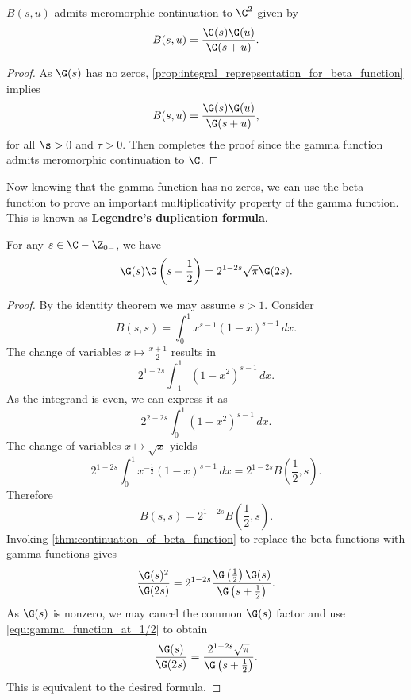 \documentclass[12pt]{article}
\begin{document}
    \begin{theorem}\label{thm:continuation_of_beta_function}
      \(B(s,u)\) admits meromorphic continuation to \(\C^{2}\) given by
      \[
        B(s,u) = \frac{\G(s)\G(u)}{\G(s+u)}.
      \]
    \end{theorem}
    \begin{proof}
      As \(\G(s)\) has no zeros, \cref{prop:integral_reprepsentation_for_beta_function} implies
      \[
        B(s,u) = \frac{\G(s)\G(u)}{\G(s+u)},
      \]
      for all \(\s > 0\) and \(\tau > 0\). Then completes the proof since the gamma function admits meromorphic continuation to \(\C\).
    \end{proof}
    
    Now knowing that the gamma function has no zeros, we can use the beta function to prove an important multiplicativity property of the gamma function. This is known as \textbf{Legendre's duplication formula}.

    \begin{theorem*}
      For any \(s \in \C-\Z_{0-}\), we have
      \[
        \G(s)\G\left(s+\frac{1}{2}\right) = 2^{1-2s}\sqrt{\pi}\G(2s).
      \]
    \end{theorem*}
    \begin{proof}
      By the identity theorem we may assume \(s > 1\). Consider
      \[
        B(s,s) = \int_{0}^{1}x^{s-1}(1-x)^{s-1}\,dx.
      \]
      The change of variables \(x \mapsto \frac{x+1}{2}\) results in
      \[
        2^{1-2s}\int_{-1}^{1}(1-x^{2})^{s-1}\,dx.
      \]
      As the integrand is even, we can express it as
      \[
        2^{2-2s}\int_{0}^{1}(1-x^{2})^{s-1}\,dx.
      \]
      The change of variables \(x \mapsto \sqrt{x}\) yields
      \[
        2^{1-2s}\int_{0}^{1}x^{-\frac{1}{2}}(1-x)^{s-1}\,dx = 2^{1-2s}B\left(\frac{1}{2},s\right).
      \]
      Therefore
      \[
        B(s,s) = 2^{1-2s}B\left(\frac{1}{2},s\right).
      \]
      Invoking \cref{thm:continuation_of_beta_function} to replace the beta functions with gamma functions gives
      \[
        \frac{\G(s)^{2}}{\G(2s)} = 2^{1-2s}\frac{\G\left(\frac{1}{2}\right)\G(s)}{\G\left(s+\frac{1}{2}\right)}.
      \]
      As \(\G(s)\) is nonzero, we may cancel the common \(\G(s)\) factor and use \cref{equ:gamma_function_at_1/2} to obtain
      \[
        \frac{\G(s)}{\G(2s)} = \frac{2^{1-2s}\sqrt{\pi}}{\G\left(s+\frac{1}{2}\right)}.
      \]
      This is equivalent to the desired formula.
    \end{proof}
\end{document}
